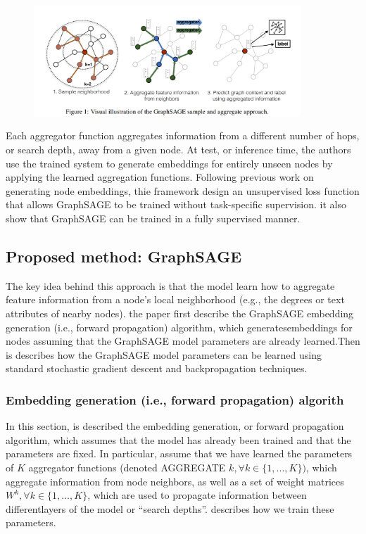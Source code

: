 \documentclass[12pt,a4paper]{article}
\begin{document}
\begin{figure}[h]
\includegraphics[width=10cm]{GraphSAGE-PIC-1}
\centering
\end{figure}
Each aggregator function aggregates information from a different number of hops, or search depth, away from a given node. At test, or inference time, the authors use the trained system to generate embeddings for entirely unseen nodes by applying the learned aggregation functions. Following previous work on generating node embeddings, thie framework design an unsupervised loss function that allows GraphSAGE to be trained without task-specific supervision. it also show that GraphSAGE can be trained in a fully supervised manner.

\subsection*{Proposed method: GraphSAGE}

The key idea behind this approach is that the model learn how to aggregate feature information from a node’s local neighborhood (e.g., the degrees or text attributes of nearby nodes).  the paper first describe the  GraphSAGE  embedding  generation  (i.e.,  forward  propagation)  algorithm,  which  generatesembeddings for nodes assuming that the GraphSAGE model parameters are already learned.Then is describes how the GraphSAGE model parameters can be learned using standard stochastic gradient descent and backpropagation techniques.

\subsubsection*{Embedding generation (i.e., forward propagation) algorith}


In this section, is described the embedding generation, or forward propagation algorithm, which assumes that the model has already been trained and that the parameters are fixed.  In particular, assume that we have learned the parameters of $K$ aggregator functions (denoted AGGREGATE $k,\forall k \in \{1,...,K\})$, which aggregate information from node neighbors, as well as a set of weight matrices $W^{k},\forall k \in \{1,...,K\}$, which are used to propagate information between differentlayers of the model or “search depths”. describes how we train these parameters.
\end{document}
